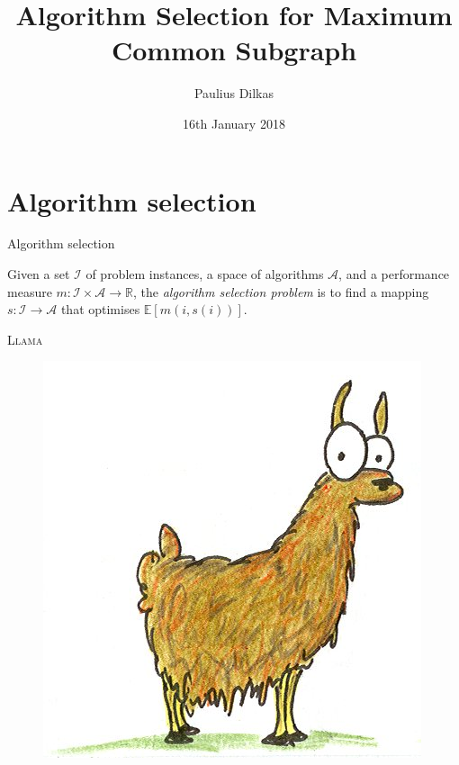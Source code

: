 \documentclass{beamer}
\author{Paulius Dilkas}
\title{Algorithm Selection for Maximum Common Subgraph}
\date{16th January 2018}
\institute{FATA seminar}
\begin{document}
\maketitle


\section{Algorithm selection}
\begin{frame}{Algorithm selection} %
  \begin{definition}
    Given a set $\mathcal{I}$ of problem instances, a space of algorithms
    $\mathcal{A}$, and a performance measure $m \colon \mathcal{I} \times
    \mathcal{A} \to \mathbb{R}$, the \emph{algorithm selection problem} is to
    find a mapping $s \colon \mathcal{I} \to \mathcal{A}$ that optimises
    $\mathbb{E}[m(i, s(i))]$.
  \end{definition}
  \pause
  \textsc{Llama} \parencite{kotthoff_llama_2013}
  \begin{figure}
    \centering
    \includegraphics[scale=0.5]{llama.jpg}
  \end{figure}
\end{frame}
\end{document}
